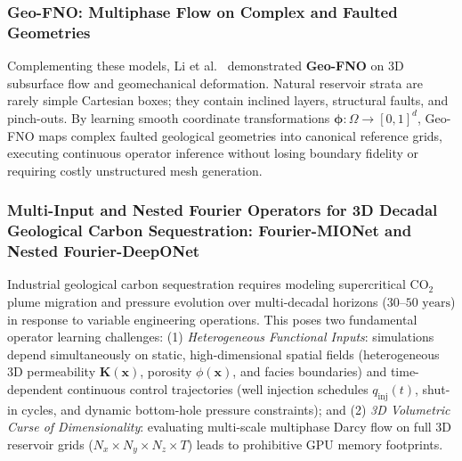 \subsubsection{Geo-FNO: Multiphase Flow on Complex and Faulted Geometries}
Complementing these models, Li et al.~\cite{li2022geofno} demonstrated \textbf{Geo-FNO} on 3D subsurface flow and geomechanical deformation. Natural reservoir strata are rarely simple Cartesian boxes; they contain inclined layers, structural faults, and pinch-outs. By learning smooth coordinate transformations $\boldsymbol{\phi}: \Omega \to [0, 1]^d$, Geo-FNO maps complex faulted geological geometries into canonical reference grids, executing continuous operator inference without losing boundary fidelity or requiring costly unstructured mesh generation.

\subsubsection{Multi-Input and Nested Fourier Operators for 3D Decadal Geological Carbon Sequestration: Fourier-MIONet and Nested Fourier-DeepONet}
Industrial geological carbon sequestration requires modeling supercritical $\text{CO}_2$ plume migration and pressure evolution over multi-decadal horizons ($30\text{--}50\text{ years}$) in response to variable engineering operations. This poses two fundamental operator learning challenges: (1) \textit{Heterogeneous Functional Inputs}: simulations depend simultaneously on static, high-dimensional spatial fields (heterogeneous 3D permeability $\mathbf{K}(\mathbf{x})$, porosity $\phi(\mathbf{x})$, and facies boundaries) and time-dependent continuous control trajectories (well injection schedules $q_{\text{inj}}(t)$, shut-in cycles, and dynamic bottom-hole pressure constraints); and (2) \textit{3D Volumetric Curse of Dimensionality}: evaluating multi-scale multiphase Darcy flow on full 3D reservoir grids ($N_x \times N_y \times N_z \times T$) leads to prohibitive GPU memory footprints.

